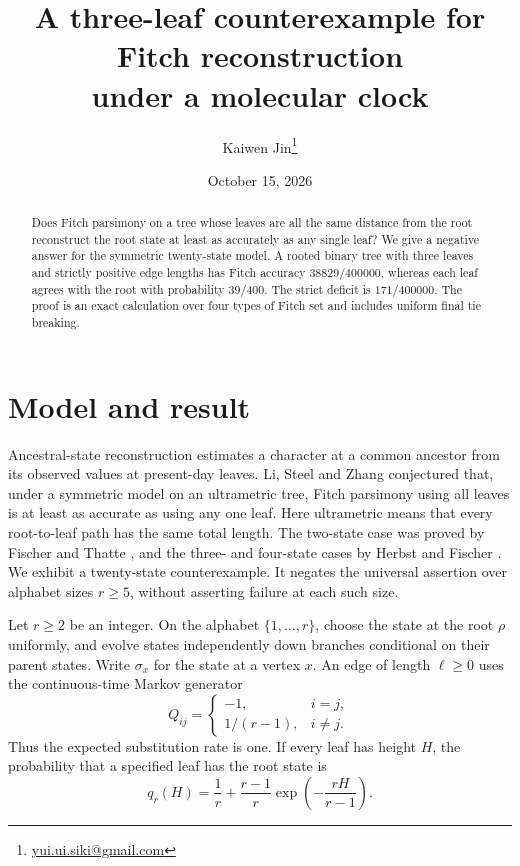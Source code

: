 \documentclass[11pt]{article}
\title{A three-leaf counterexample for Fitch reconstruction\protect\\ under a molecular clock}
\author{Kaiwen Jin\thanks{\href{mailto:yui.ui.siki@gmail.com}{yui.ui.siki@gmail.com}}}
\date{October 15, 2026}
\begin{document}
\maketitle
\begin{abstract}
Does Fitch parsimony on a tree whose leaves are all the same distance from the
root reconstruct the root state at least as accurately as any single leaf?
We give a negative answer for the symmetric twenty-state model. A rooted binary
tree with three leaves and strictly positive edge lengths has Fitch accuracy
$38829/400000$, whereas each leaf agrees with the root with probability
$39/400$. The strict deficit is $171/400000$. The proof is an exact calculation
over four types of Fitch set and includes uniform final tie breaking.
\end{abstract}

\section{Model and result}

Ancestral-state reconstruction estimates a character at a common ancestor from
its observed values at present-day leaves. Li, Steel and Zhang
\cite[p.~652]{LSZ08} conjectured that, under a symmetric model on an ultrametric
tree, Fitch parsimony using all leaves is at least as accurate as using any one
leaf. Here ultrametric means that every root-to-leaf path has the same total
length. The two-state case was proved by Fischer and Thatte
\cite[author version, Theorem~2]{FT09}, and the three- and four-state cases by Herbst and Fischer
\cite[author version, Theorems~1--2]{HF18}. We exhibit a twenty-state counterexample. It negates
the universal assertion over alphabet sizes $r\geq5$, without asserting failure
at each such size.

Let $r\geq2$ be an integer. On the alphabet $\{1,\ldots,r\}$, choose the
state at the root $\rho$ uniformly, and evolve states independently down
branches conditional on their parent states. Write $\sigma_x$ for the state
at a vertex $x$. An edge
of length $\ell\geq0$ uses the continuous-time Markov generator
\begin{equation}\label{eq:generator}
 Q_{ij}=\begin{cases}-1,&i=j,\\1/(r-1),&i\ne j.\end{cases}
\end{equation}
Thus the expected substitution rate is one. If every leaf has height $H$,
the probability that a specified leaf has the root state is
\begin{equation}\label{eq:benchmark}
 q_r(H)=\frac1r+\frac{r-1}{r}\exp\!\left(-\frac{rH}{r-1}\right).
\end{equation}
\end{document}
